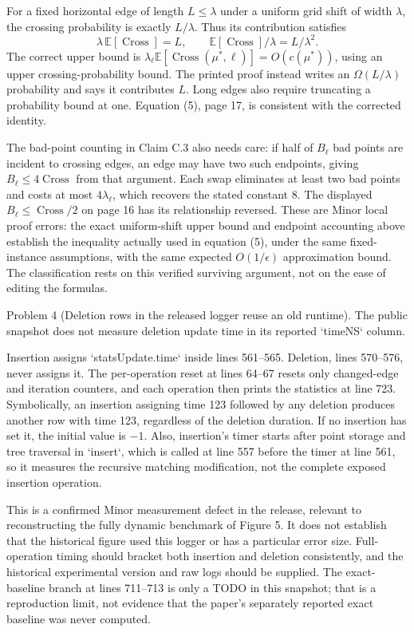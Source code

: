 \documentclass[10pt]{article}
\begin{document}
For a fixed horizontal edge of length \(L\leq\lambda\) under a uniform grid shift of width \(\lambda\), the crossing probability is exactly \(L/\lambda\). Thus its contribution satisfies \[\lambda\,\mathbb E[\operatorname{Cross}]=L,
 \qquad \mathbb E[\operatorname{Cross}]/\lambda=L/\lambda^2.\] The correct upper bound is \(\lambda_\ell\mathbb E[\operatorname{Cross}(\mu^*,\ell)]=O(c(\mu^*))\), using an upper crossing-probability bound. The printed proof instead writes an \(\Omega(L/\lambda)\) probability and says it contributes \(L\). Long edges also require truncating a probability bound at one. Equation (5), page 17, is consistent with the corrected identity.\par
The bad-point counting in Claim C.3 also needs care: if half of \(B_\ell\) bad points are incident to crossing edges, an edge may have two such endpoints, giving \(B_\ell\leq4\operatorname{Cross}\) from that argument. Each swap eliminates at least two bad points and costs at most \(4\lambda_\ell\), which recovers the stated constant 8. The displayed \(B_\ell\leq\operatorname{Cross}/2\) on page 16 has its relationship reversed. These are Minor local proof errors: the exact uniform-shift upper bound and endpoint accounting above establish the inequality actually used in equation (5), under the same fixed-instance assumptions, with the same expected \(O(1/\epsilon)\) approximation bound. The classification rests on this verified surviving argument, not on the ease of editing the formulas.\par
Problem 4 (Deletion rows in the released logger reuse an old runtime).  The public snapshot does not measure deletion update time in its reported `timeNS` column.\par
Insertion assigns `statsUpdate.time` inside lines 561–565. Deletion, lines 570–576, never assigns it. The per-operation reset at lines 64–67 resets only changed-edge and iteration counters, and each operation then prints the statistics at line 723. Symbolically, an insertion assigning time 123 followed by any deletion produces another row with time 123, regardless of the deletion duration. If no insertion has set it, the initial value is \(-1\). Also, insertion’s timer starts after point storage and tree traversal in `insert`, which is called at line 557 before the timer at line 561, so it measures the recursive matching modification, not the complete exposed insertion operation.\par
This is a confirmed Minor measurement defect in the release, relevant to reconstructing the fully dynamic benchmark of Figure 5. It does not establish that the historical figure used this logger or has a particular error size. Full-operation timing should bracket both insertion and deletion consistently, and the historical experimental version and raw logs should be supplied. The exact-baseline branch at lines 711–713 is only a TODO in this snapshot; that is a reproduction limit, not evidence that the paper’s separately reported exact baseline was never computed.\par
\end{document}
